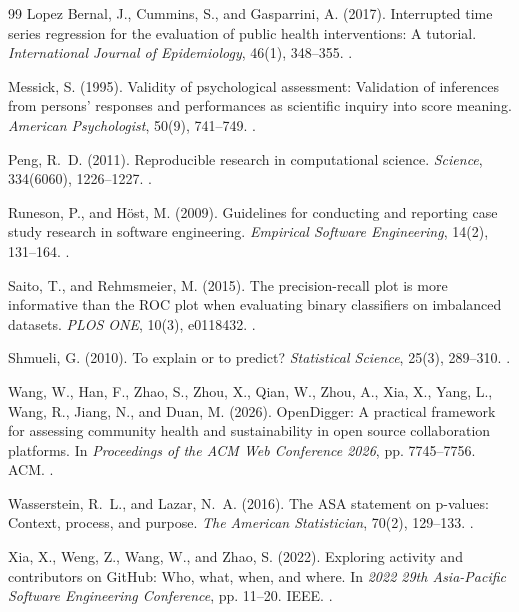 \begin{thebibliography}{99}
Lopez Bernal, J., Cummins, S., and Gasparrini, A. (2017).
Interrupted time series regression for the evaluation of public health interventions: A tutorial.
\emph{International Journal of Epidemiology}, 46(1), 348--355.
.

Messick, S. (1995).
Validity of psychological assessment: Validation of inferences from persons' responses and performances as scientific inquiry into score meaning.
\emph{American Psychologist}, 50(9), 741--749.
.

Peng, R.~D. (2011).
Reproducible research in computational science.
\emph{Science}, 334(6060), 1226--1227.
.

Runeson, P., and Höst, M. (2009).
Guidelines for conducting and reporting case study research in software engineering.
\emph{Empirical Software Engineering}, 14(2), 131--164.
.

Saito, T., and Rehmsmeier, M. (2015).
The precision-recall plot is more informative than the ROC plot when evaluating binary classifiers on imbalanced datasets.
\emph{PLOS ONE}, 10(3), e0118432.
.

Shmueli, G. (2010).
To explain or to predict?
\emph{Statistical Science}, 25(3), 289--310.
.

Wang, W., Han, F., Zhao, S., Zhou, X., Qian, W., Zhou, A., Xia, X., Yang, L., Wang, R., Jiang, N., and Duan, M. (2026).
OpenDigger: A practical framework for assessing community health and sustainability in open source collaboration platforms.
In \emph{Proceedings of the ACM Web Conference 2026}, pp. 7745--7756. ACM.
.

Wasserstein, R.~L., and Lazar, N.~A. (2016).
The ASA statement on p-values: Context, process, and purpose.
\emph{The American Statistician}, 70(2), 129--133.
.

Xia, X., Weng, Z., Wang, W., and Zhao, S. (2022).
Exploring activity and contributors on GitHub: Who, what, when, and where.
In \emph{2022 29th Asia-Pacific Software Engineering Conference}, pp. 11--20. IEEE.
.


\end{thebibliography}
